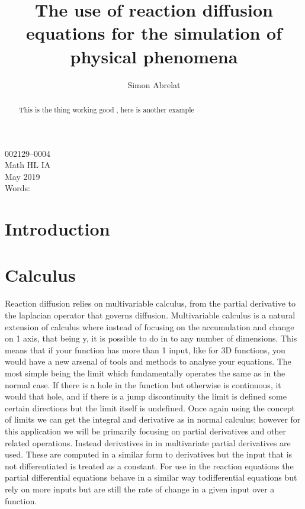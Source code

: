 \documentclass[12pt]{article}
\title{The use of reaction diffusion equations for the simulation of physical phenomena}
\author{Simon Abrelat}
\date{\vspace{-5ex}}
\begin{document}
\large
{\fontsize{12}{14.4}
  {\singlespace{}
  \maketitle
  \begin{center}
  \vspace{4mm}
  002129--0004 \\
  \vspace{4mm}
  Math HL IA \\
  \vspace{4mm}
  May 2019 \\
  \vspace{4mm}
  Words: \\
  \end{center}
  }
}
\newpage

\begin{abstract}
  This is the thing working good \citep{turing}, here is another example \citep*{grayscott}
\end{abstract}

\newpage
\tableofcontents
\newpage 

\section{Introduction}

\section{Calculus}
Reaction diffusion relies on multivariable calculus, from the partial derivative to the laplacian
operator that governs diffusion. Multivariable calculus is a natural extension of calculus where instead of focusing on
the accumulation and change on 1 axis, that being y, it is possible to do in to any
number of dimensions. This means that if your function has more than 1 input, like for 3D functions, you would
have a new arsenal of tools and methods to analyse your equations. The most simple being the limit which
fundamentally operates the same as in the normal case. If there is a hole in the function but otherwise is
continuous, it would  that hole, and if there is a jump discontinuity the limit is defined some
certain directions but the limit itself is undefined. Once again using the concept of limits we can get the
integral and derivative as in normal calculus; however for this application we will be primarily focusing on
partial derivatives and other related operations. Instead derivatives in in multivariate partial derivatives
are used. These are computed in a similar form to derivatives but the input that is not differentiated is
treated as a constant. For use in the reaction equations the partial differential equations behave in a
similar way todifferential equations but rely on more inputs but are still the rate of change in a given input
over a function. 
\end{document}
